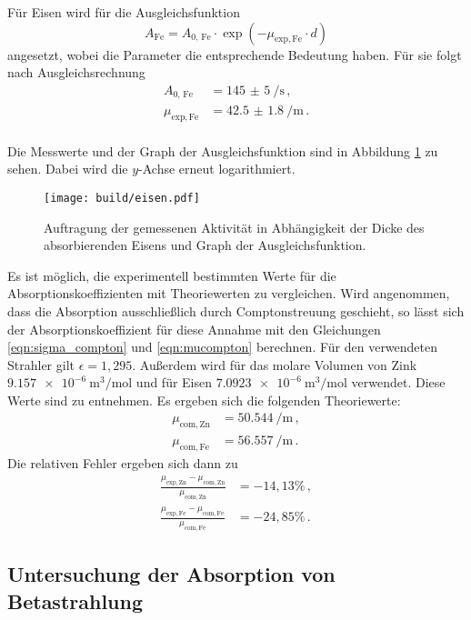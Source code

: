 Für Eisen wird für die Ausgleichsfunktion
\begin{equation*}
  A_\mathrm{Fe} = A_{0,\,\text{Fe}} \cdot \exp(-\mu_{\text{exp},\,\text{Fe}} \cdot d)
\end{equation*}
angesetzt, wobei die Parameter die entsprechende Bedeutung haben.
Für sie folgt nach Ausgleichsrechnung
\begin{align*}
  A_{0,\,\text{Fe}} &= \SI{145(5)}{\per\second}\,,\\
  \mu_{\text{exp},\,\text{Fe}} &=  \SI{42.5(18)}{\per\meter}\,.
\end{align*}
\\
Die Messwerte und der Graph der Ausgleichsfunktion sind in Abbildung \ref{fig:eisen}
zu sehen. Dabei wird die $y$-Achse erneut logarithmiert.

\begin{figure}
  \centering
  \texttt{[image: build/eisen.pdf]}
  \caption{Auftragung der gemessenen Aktivität in Abhängigkeit der Dicke des absorbierenden Eisens und Graph der Ausgleichsfunktion.}
  \label{fig:eisen}
\end{figure}

Es ist möglich, die experimentell bestimmten Werte für die Absorptionskoeffizienten mit
Theoriewerten zu vergleichen. Wird angenommen, dass die Absorption ausschließlich durch
Comptonstreuung geschieht, so lässt sich der Absorptionskoeffizient für diese Annahme
mit den Gleichungen \eqref{eqn:sigma_compton} und \eqref{eqn:mucompton} berechnen.
Für den verwendeten Strahler gilt $\epsilon = 1{,}295$. Außerdem wird für das molare Volumen
von Zink $\SI{9.157e-6}{\cubic\meter\per\mole}$ und für Eisen $\SI{7.0923e-6}{\cubic\meter\per\mole}$
verwendet. Diese Werte sind \cite{molarvolume} zu entnehmen. Es ergeben sich die folgenden Theoriewerte:
\begin{align*}
  \mu_{\text{com},\,\text{Zn}} &=  \SI{50.544}{\per\meter}\,,\\
  \mu_{\text{com},\,\text{Fe}} &=  \SI{56.557}{\per\meter}\,.
\end{align*}
Die relativen Fehler ergeben sich dann zu
\begin{align*}
  \frac{\mu_{\text{exp},\,\text{Zn}} - \mu_{\text{com},\,\text{Zn}}}{\mu_{\text{com},\,\text{Zn}}} &= -14{,}13 \% \,,\\
  \frac{\mu_{\text{exp},\,\text{Fe}} - \mu_{\text{com},\,\text{Fe}}}{\mu_{\text{com},\,\text{Fe}}} &= -24{,}85 \% \,.
\end{align*}

\subsection{Untersuchung der Absorption von Betastrahlung}
\label{subsec:auswertungbeta}

